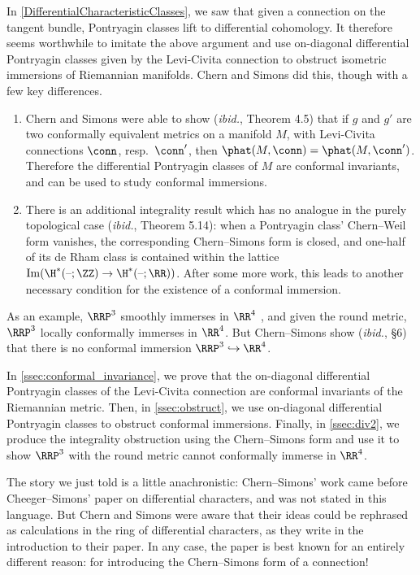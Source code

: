 In \cref{DifferentialCharacteristicClasses}, we saw that given a connection on the tangent bundle, Pontryagin
classes lift to differential cohomology. It therefore seems worthwhile to imitate the above argument and use
on-diagonal differential Pontryagin classes given by the Levi-Civita connection to obstruct isometric immersions of
Riemannian manifolds. Chern and Simons \cite{cs} did this, though with a few key differences.
\begin{enumerate}[(1)]
	\item Chern and Simons were able to show (\textit{ibid.}, Theorem 4.5) that if $g$ and $g'$ are two conformally
	equivalent metrics on a manifold $M$, with Levi-Civita connections $\conn$, resp.\ $\conn'$, then $\phat(M,
	\conn) = \phat(M, \conn')$. Therefore the differential Pontryagin classes of $M$ are conformal invariants,
	and can be used to study conformal immersions.
	\item There is an additional integrality result which has no analogue in the purely topological case
	(\textit{ibid.}, Theorem 5.14): when a Pontryagin class' Chern--Weil form vanishes, the corresponding
	Chern--Simons form is closed, and one-half of its de Rham class is contained within the lattice
	$\mathrm{Im}(\H^*(\text{--};\ZZ)\to\H^*(\text{--};\RR))$. After some more work, this leads to another necessary
	condition for the existence of a conformal immersion.
\end{enumerate}
As an example, $\RRP^3$ smoothly immerses in $\RR^4$ \cite{Boy03}, and given the round metric,
$\RRP^3$ locally conformally immerses in $\RR^4$. But Chern--Simons show (\textit{ibid.}, \S 6) that there is
no conformal immersion $\RRP^3\hookrightarrow\RR^4$.

In \cref{ssec:conformal_invariance}, we prove that the on-diagonal differential Pontryagin classes of the
Levi-Civita connection are conformal invariants of the Riemannian metric. Then, in \cref{ssec:obstruct}, we use
on-diagonal differential Pontryagin classes to obstruct conformal immersions. Finally, in \cref{ssec:div2}, we
produce the integrality obstruction using the Chern--Simons form and use it to show $\RRP^3$ with the round metric
cannot conformally immerse in $\RR^4$.

\begin{remark}
	The story we just told is a little anachronistic: Chern--Simons' work came before Cheeger--Simons' paper on
	differential characters, and was not stated in this language. But Chern and Simons were aware that their ideas
	could be rephrased as calculations in the ring of differential characters, as they write in the introduction to
	their paper. In any case, the paper \cite{cs} is best known for an entirely different reason: for introducing the
	Chern--Simons form of a connection!
\end{remark}


